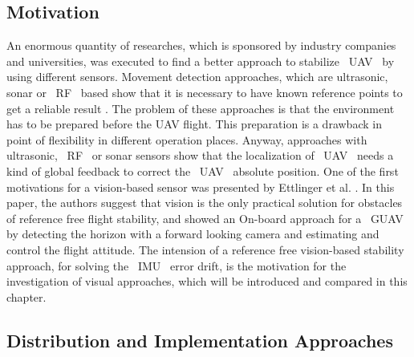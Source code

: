 \subsection{Motivation}
An enormous quantity of researches, which is sponsored by industry companies and
universities, was executed to find a better approach to stabilize ~\gls{UAV}~ by
using different sensors. Movement detection approaches, which are ultrasonic, sonar or
~\gls{RF}~ based show that it is necessary to have known reference points to get a
reliable result  . The
problem of these approaches is that the environment has to be prepared before the
\gls{UAV} flight. This preparation is a drawback in point of flexibility in different
operation places. Anyway, approaches with ultrasonic, ~\gls{RF}~ or sonar sensors
show that the localization of ~\gls{UAV}~ needs a kind of global feedback to correct
the ~\gls{UAV}~ absolute position. One of the first motivations for a vision-based
sensor was presented by Ettlinger et al. .
\newpage
In this paper, the authors suggest that vision is the
only practical solution for obstacles of reference free flight stability, and
showed an On-board approach for a ~\gls{GUAV}~ by detecting the horizon with a
forward looking camera and estimating and control the flight attitude.
The intension of a reference free vision-based stability
approach, for solving the ~\gls{IMU}~ error drift, is the motivation for the
investigation of visual approaches, which will be introduced and compared in this chapter.


\subsection{Distribution and Implementation Approaches}
\label{mt:c:LiteratureReview:Distribution and implementation approaches}

